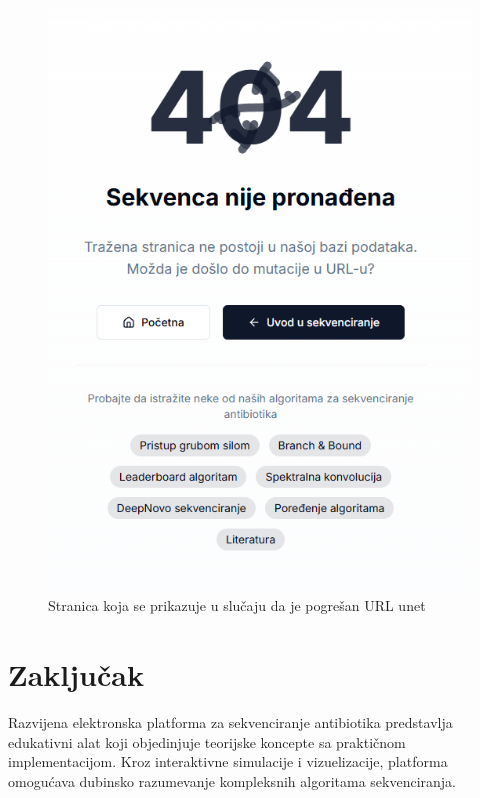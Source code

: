 \documentclass[12pt,oneside]{memoir}
\begin{document}
\begin{figure}[H]
\centering
\includegraphics[height=0.5\textheight]{images/wrong_page.png}
\caption{Stranica koja se prikazuje u slučaju da je pogrešan URL unet}
\label{fig:wrong_page}
\end{figure}

\chapter{Zaključak}

Razvijena elektronska platforma za sekvenciranje antibiotika predstavlja edukativni alat koji objedinjuje teorijske koncepte sa praktičnom implementacijom. Kroz interaktivne simulacije i vizuelizacije, platforma omogućava dubinsko razumevanje kompleksnih algoritama sekvenciranja.
\end{document}
